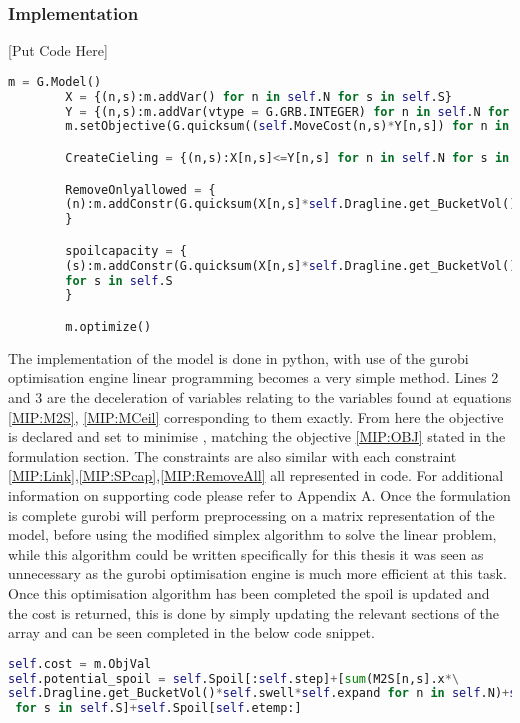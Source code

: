 \subsubsection{Implementation}
[Put Code Here]
\begin{lstlisting}[language=Python]
		m = G.Model()
		X = {(n,s):m.addVar() for n in self.N for s in self.S}
		Y = {(n,s):m.addVar(vtype = G.GRB.INTEGER) for n in self.N for s in self.S}
		m.setObjective(G.quicksum((self.MoveCost(n,s)*Y[n,s]) for n in self.N for s in self.S),G.GRB.MINIMIZE)

		CreateCieling = {(n,s):X[n,s]<=Y[n,s] for n in self.N for s in self.S}

		RemoveOnlyallowed = {
		(n):m.addConstr(G.quicksum(X[n,s]*self.Dragline.get_BucketVol() for s in self.S)==self.Mine[n]) for n in self.N
		}

		spoilcapacity = {
		(s):m.addConstr(G.quicksum(X[n,s]*self.Dragline.get_BucketVol()*self.swell*self.expand for n in self.N)+self.Spoil[s]<=self.spoilcap)
		for s in self.S
		}

		m.optimize()
\end{lstlisting}
The implementation of the model is done in python, with use of the gurobi optimisation engine linear programming becomes a very simple method. Lines 2 and 3 are the deceleration of variables relating to the variables found at equations \ref{MIP:M2S}, \ref{MIP:MCeil} corresponding to them exactly. From here the objective is declared and set to minimise , matching the objective \ref{MIP:OBJ} stated in the formulation section. The constraints are also similar with each constraint \ref{MIP:Link},\ref{MIP:SPcap},\ref{MIP:RemoveAll} all represented in code. For additional information on supporting code please refer to Appendix A. Once the formulation is complete gurobi will perform preprocessing on a matrix representation of the model, before using the modified simplex algorithm to solve the linear problem, while this algorithm could be written specifically for this thesis it was seen as unnecessary as the gurobi optimisation engine is much more efficient at this task. 
\\
Once this optimisation algorithm has been completed the spoil is updated and the cost is returned, this is done by simply updating the relevant sections of the array and can be seen completed in the below code snippet.
\begin{lstlisting}[language=python]
self.cost = m.ObjVal
self.potential_spoil = self.Spoil[:self.step]+[sum(M2S[n,s].x*\
self.Dragline.get_BucketVol()*self.swell*self.expand for n in self.N)+self.Spoil[s]\
 for s in self.S]+self.Spoil[self.etemp:]

\end{lstlisting}
